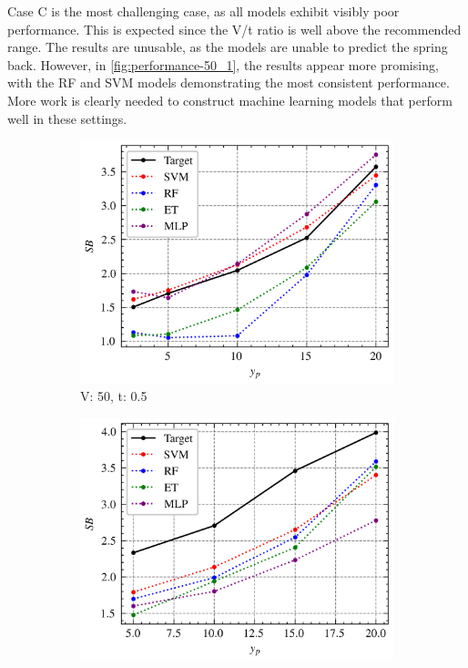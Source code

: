 Case C is the most challenging case, as all models exhibit visibly poor performance.
This is expected since the V/t ratio is well above the recommended range.
The results are unusable, as the models are unable to predict the spring back.
However, in \cref{fig:performance-50_1}, the results appear more promising, with the RF and SVM models
demonstrating the most consistent performance.
More work is clearly needed to construct machine learning models that perform well in these settings.

\begin{figure}[h]
    \begin{tcolorbox}[arc=0pt,boxrule=0.5pt]
        \begin{subfigure}{0.5\textwidth}
            \includegraphics[width=\textwidth]{chap5/images/performance_40_0.5}
            \caption{V: 50, t: 0.5}
            \label{fig:performance-50_0.5}
        \end{subfigure}
        \hfill
        \begin{subfigure}{0.5\textwidth}
            \includegraphics[width=\textwidth]{chap5/images/performance_50_0.5}

\end{subfigure}
\end{tcolorbox}
\end{figure}
